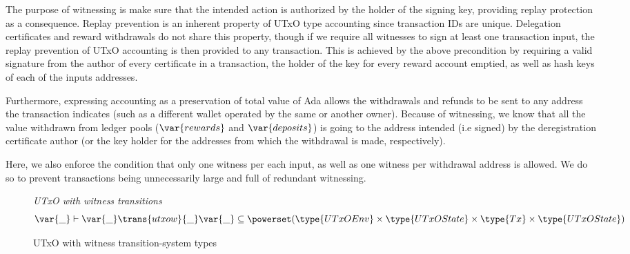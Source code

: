 \documentclass[11pt,a4paper,dvipsnames]{article}
\newcommand{\Tx}{\type{Tx}}
\newcommand{\UTxOState}{\ensuremath{\type{UTxOState}}}
\newcommand{\UTxOEnv}{\type{UTxOEnv}}
\theoremstyle{definition}
\theoremstyle{definition}
\begin{document}
The purpose of witnessing is make sure that the intended action is authorized by
the holder of the signing key, providing replay protection as a consequence.
Replay prevention is an inherent property of UTxO type accounting
since transaction IDs are unique.
Delegation certificates and reward withdrawals do not share this property,
though if we require all witnesses to sign at least one transaction input,
the replay prevention of UTxO accounting is then provided to any transaction.
This is achieved by the above precondition by requiring a valid signature
from the author of every certificate in a transaction, the
holder of the key for every reward account emptied, as well as
hash keys of each of the inputs addresses.

Furthermore, expressing
accounting as a preservation of total value of Ada allows the withdrawals
and refunds to be sent to any address the transaction indicates
(such as a different wallet operated by the same or another owner).
Because of witnessing, we know that all the value withdrawn from ledger
pools ($\var{rewards}$ and $\var{deposits}$) is going to the address intended
(i.e signed) by the deregistration certificate author
(or the key holder for the addresses from which the withdrawal is made,
respectively).

Here, we also enforce the condition that only one witness per each input,
as well as one
witness per withdrawal address is allowed. We do so to prevent transactions
being unnecessarily large and full of redundant witnessing.

\begin{figure}
  \emph{UTxO with witness transitions}
  \begin{equation*}
    \var{\_} \vdash
    \var{\_} \trans{utxow}{\_} \var{\_}
    \subseteq \powerset (\UTxOEnv \times \UTxOState \times \Tx \times \UTxOState)
  \end{equation*}
  \caption{UTxO with witness transition-system types}
  \label{fig:ts-types:utxow}
\end{figure}
\end{document}
